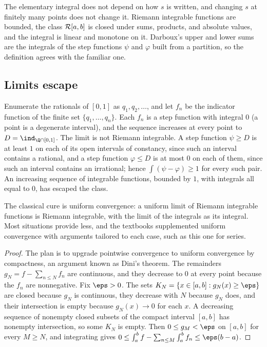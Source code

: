 \begin{refsection}
The elementary integral does not depend on how $s$ is written, and changing $s$ at finitely many points does not change it. Riemann integrable functions are bounded, the class $\mathcal{R}[a,b]$ is closed under sums, products, and absolute values, and the integral is linear and monotone on it. Darboux's upper and lower sums are the integrals of the step functions $\psi$ and $\varphi$ built from a partition, so the definition agrees with the familiar one.

\subsection{Limits escape}\label{sec:lebesgue:escape}

Enumerate the rationals of $[0,1]$ as $q_1,q_2,\dots$, and let $f_n$ be the indicator function of the finite set $\{q_1,\dots,q_n\}$. Each $f_n$ is a step function with integral $0$ (a point is a degenerate interval), and the sequence increases at every point to  $D=\ind_{\Q\cap[0,1]}$. The limit is not Riemann integrable. A step function $\psi\ge D$ is at least $1$ on each of its open intervals of constancy, since such an interval contains a rational, and a step function $\varphi\le D$ is at most $0$ on each of them, since such an interval contains an irrational; hence $\int(\psi-\varphi)\ge1$ for every such pair. An increasing sequence of integrable functions, bounded by $1$, with integrals all equal to $0$, has escaped the class.

The classical cure is uniform convergence: a uniform limit of Riemann integrable functions is Riemann integrable, with the limit of the integrals as its integral. Most situations provide less, and the textbooks supplemented uniform convergence with arguments tailored to each case, such as this one for series.


\begin{proof}
The plan is to upgrade pointwise convergence to uniform convergence by compactness, an argument known as Dini's theorem. The remainders $g_N=f-\sum_{n\le N}f_n$ are continuous, and they decrease to $0$ at every point because the $f_n$ are nonnegative. Fix $\eps>0$. The sets $K_N=\{x\in[a,b]:g_N(x)\ge\eps\}$ are closed because $g_N$ is continuous, they decrease with $N$ because $g_N$ does, and their intersection is empty because $g_N(x)\to0$ for each $x$. A decreasing sequence of nonempty closed subsets of the compact interval $[a,b]$ has nonempty intersection, so some $K_N$ is empty. Then $0\le g_M<\eps$ on $[a,b]$ for every $M\ge N$, and integrating gives $0\le\int_a^b f-\sum_{n\le M}\int_a^b f_n\le\eps(b-a)$.
\end{proof}


\end{refsection}
